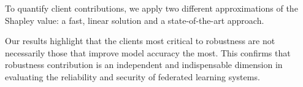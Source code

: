 To quantify client contributions, we apply two different approximations of the Shapley value: a fast, linear solution and a state-of-the-art approach.

Our results highlight that the clients most critical to robustness are not necessarily those that improve model accuracy the most. This confirms that robustness contribution is an independent and indispensable dimension in evaluating the reliability and security of federated learning systems.


\vfill
\selectthesislanguage

\setcounter{romanPage}{\value{page}}
